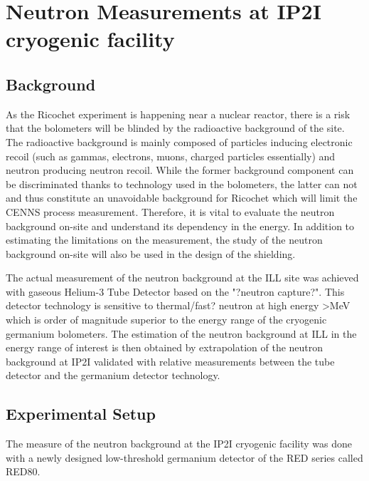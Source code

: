 
\chapter{Neutron Measurements at IP2I cryogenic facility} %

\label{ChapterNeutron} %


\section{Background}

As the Ricochet experiment is happening near a nuclear reactor, there is a risk that the bolometers will be blinded by the radioactive background of the site.
The radioactive background is mainly composed of particles inducing electronic recoil (such as gammas, electrons, muons, charged particles essentially) and neutron producing neutron recoil.
While the former background component can be discriminated thanks to technology used in the bolometers, the latter can not and thus constitute an unavoidable background for Ricochet which will limit the CENNS process measurement.
Therefore, it is vital to evaluate the neutron background on-site and understand its dependency in the energy.
In addition to estimating the limitations on the measurement, the study of the neutron background on-site will also be used in the design of the shielding.

The actual measurement of the neutron background at the ILL site was achieved with gaseous Helium-3 Tube Detector based on the "?neutron capture?". 
This detector technology is sensitive to thermal/fast? neutron at high energy >MeV which is order of magnitude superior to the energy range of the cryogenic germanium bolometers.
The estimation of the neutron background at ILL in the energy range of interest is then obtained by extrapolation of the neutron background at IP2I validated with relative measurements between the tube detector and the germanium detector technology.

\section{Experimental Setup}

The measure of the neutron background at the IP2I cryogenic facility was done with a newly designed low-threshold germanium detector of the RED series called RED80.

